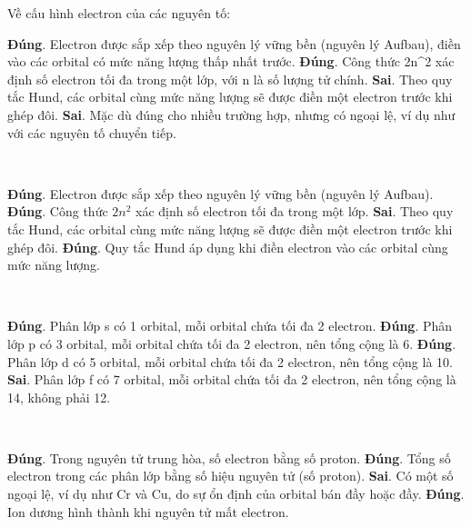\def\writeANS{\TLdung{A}\TLdung{B}\TLsai{C}\TLsai{D}}
\begin{loigiaiex}{36}
  Về cấu hình electron của các nguyên tố: \begin {itemchoice} \itemch \textbf {Đúng}. Electron được sắp xếp theo nguyên lý vững bền (nguyên lý Aufbau), điền vào các orbital có mức năng lượng thấp nhất trước. \itemch \textbf {Đúng}. Công thức 2n^2 xác định số electron tối đa trong một lớp, với n là số lượng tử chính. \itemch \textbf {Sai}. Theo quy tắc Hund, các orbital cùng mức năng lượng sẽ được điền một electron trước khi ghép đôi. \itemch \textbf {Sai}. Mặc dù đúng cho nhiều trường hợp, nhưng có ngoại lệ, ví dụ như với các nguyên tố chuyển tiếp. \end {itemchoice}  \phantom {a}\hfill { \faKey ~\writeANS }
\end{loigiaiex}
\def\writeANS{\TLsai{C}\TLdung{D}}
\begin{loigiaiex}{37}
  \begin {itemchoice} \itemch \textbf {Đúng}. Electron được sắp xếp theo nguyên lý vững bền (nguyên lý Aufbau). \itemch \textbf {Đúng}. Công thức $2n^2$ xác định số electron tối đa trong một lớp. \itemch \textbf {Sai}. Theo quy tắc Hund, các orbital cùng mức năng lượng sẽ được điền một electron trước khi ghép đôi. \itemch \textbf {Đúng}. Quy tắc Hund áp dụng khi điền electron vào các orbital cùng mức năng lượng. \end {itemchoice}  \phantom {a}\hfill { \faKey ~\writeANS }
\end{loigiaiex}
\def\writeANS{\TLdung{C}\TLsai{D}}
\begin{loigiaiex}{38}
  \begin {itemchoice} \itemch \textbf {Đúng}. Phân lớp s có 1 orbital, mỗi orbital chứa tối đa 2 electron. \itemch \textbf {Đúng}. Phân lớp p có 3 orbital, mỗi orbital chứa tối đa 2 electron, nên tổng cộng là 6. \itemch \textbf {Đúng}. Phân lớp d có 5 orbital, mỗi orbital chứa tối đa 2 electron, nên tổng cộng là 10. \itemch \textbf {Sai}. Phân lớp f có 7 orbital, mỗi orbital chứa tối đa 2 electron, nên tổng cộng là 14, không phải 12. \end {itemchoice}  \phantom {a}\hfill { \faKey ~\writeANS }
\end{loigiaiex}
\def\writeANS{\TLsai{C}\TLdung{D}}
\begin{loigiaiex}{39}
  \begin {itemchoice} \itemch \textbf {Đúng}. Trong nguyên tử trung hòa, số electron bằng số proton. \itemch \textbf {Đúng}. Tổng số electron trong các phân lớp bằng số hiệu nguyên tử (số proton). \itemch \textbf {Sai}. Có một số ngoại lệ, ví dụ như Cr và Cu, do sự ổn định của orbital bán đầy hoặc đầy. \itemch \textbf {Đúng}. Ion dương hình thành khi nguyên tử mất electron. \end {itemchoice}  \phantom {a}\hfill { \faKey ~\writeANS }
\end{loigiaiex}
